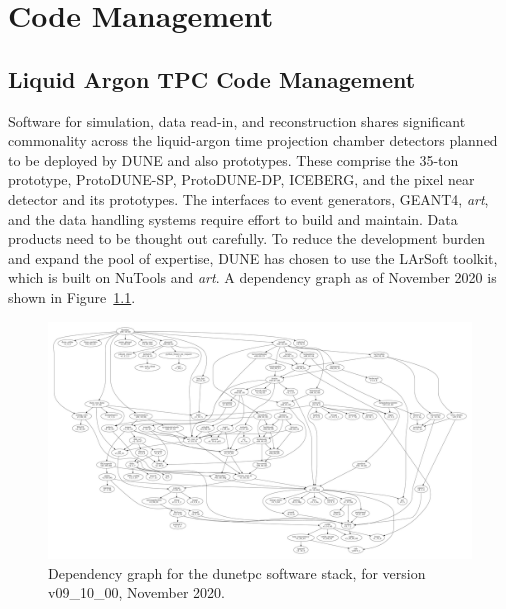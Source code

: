 \chapter{Code Management }
\label{ch:codemgmt}

\section{Liquid Argon TPC Code Management}
\label{sec:codemgmt:dunetpc}  %

Software for simulation, data read-in, and reconstruction shares significant commonality across the liquid-argon time projection chamber detectors planned to be deployed by DUNE and also prototypes.  These comprise the 35-ton prototype, ProtoDUNE-SP, ProtoDUNE-DP, ICEBERG, and the pixel near detector and its prototypes.  The interfaces to event generators, GEANT4, {\it art}, and the data handling systems require effort to build and maintain.  Data products need to be thought out carefully.  To reduce the development burden and expand the pool of expertise, DUNE has chosen to use the LArSoft toolkit, which is built on NuTools and {\it art}.  A dependency graph as of November 2020 is shown in Figure~\ref{fig:dunetpcdeptree}.

\begin{figure}[h]
    \centering
\includegraphics[width=\textwidth]{graphics/CodeManagementFigures/dunetpc_v09_10_00_depgraph.pdf}
    \caption{Dependency graph for the dunetpc software stack, for version v09\_10\_00, November 2020.}
    \label{fig:dunetpcdeptree}
\end{figure}

